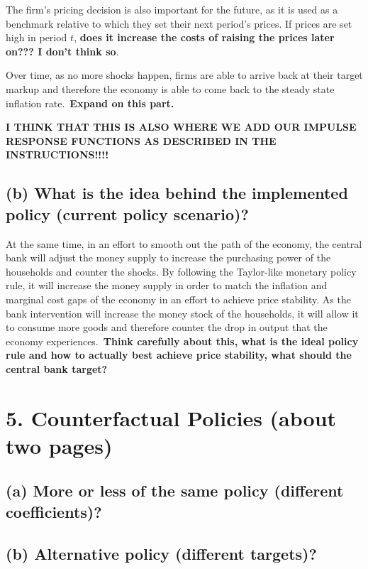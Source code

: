 \documentclass[12pt]{article}
\begin{document}
The firm's pricing decision is also important for the future, as it is used as a benchmark relative to which they set their next period's prices. If prices are set high in period $t$, \textbf{does it increase the costs of raising the prices later on??? I don't think so}.

Over time, as no more shocks happen, firms are able to arrive back at their target markup and therefore the economy is able to come back to the steady state inflation rate.\ \textbf{Expand on this part.}


\textbf{I THINK THAT THIS IS ALSO WHERE WE ADD OUR IMPULSE RESPONSE FUNCTIONS AS DESCRIBED IN THE INSTRUCTIONS!!!!}

\subsection*{(b) What is the idea behind the implemented policy (current policy scenario)?}

At the same time, in an effort to smooth out the path of the economy, the central bank will adjust the money supply to increase the purchasing power of the households and counter the shocks. By following the Taylor-like monetary policy rule, it will increase the money supply in order to match the inflation and marginal cost gaps of the economy in an effort to achieve price stability. As the bank intervention will increase the money stock of the households, it will allow it to consume more goods and therefore counter the drop in output that the economy experiences.\ \textbf{Think carefully about this, what is the ideal policy rule and how to actually best achieve price stability, what should the central bank target?}

\newpage
\section*{5. Counterfactual Policies (about two pages)}
\subsection*{(a) More or less of the same policy (different coefficients)?}

\subsection*{(b) Alternative policy (different targets)?}
\end{document}

